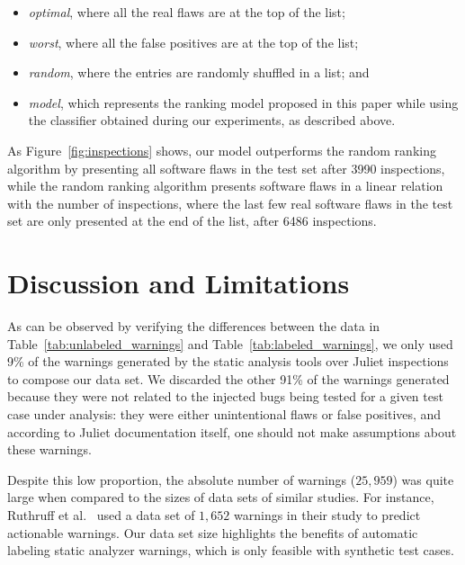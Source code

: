 \begin{itemize}
\item\textit{optimal}, where all the real flaws are at the top of the list;
\item\textit{worst}, where all the false positives are at the top of the list;
\item\textit{random}, where the entries are randomly shuffled in a list; and
\item\textit{model}, which represents the ranking model proposed in this paper while
using the classifier obtained during our experiments, as described above.
\end{itemize}

As Figure~\ref{fig:inspections} shows, our model outperforms the random ranking
algorithm by presenting all software flaws in the test set after 3990
inspections, while the random ranking algorithm presents software flaws in a
linear relation with the number of inspections, where the last few real
software flaws in the test set are only presented at the end of the list, after
6486 inspections.


\section{Discussion and Limitations}
\label{sec:discussion}

As can be observed by verifying the differences between the data in
Table~\ref{tab:unlabeled_warnings} and Table~\ref{tab:labeled_warnings}, we
only used 9\% of the warnings generated by the static analysis tools over
Juliet inspections to compose our data set. We discarded the other 91\% of the
warnings generated because they were not related to the injected bugs being
tested for a given test case under analysis: they were either unintentional
flaws or false positives, and according to Juliet documentation itself, one
should not make assumptions about these warnings.

Despite this low proportion, the absolute number of warnings ($25,959$) was quite large
when compared to the sizes of data sets of similar studies. For instance, Ruthruff et
al.~\cite{ruthruff_predicting_2008} used a data set of $1,652$ warnings in
their study to predict actionable warnings. Our data set size highlights the
benefits of automatic labeling static analyzer warnings, which is only feasible
with synthetic test cases.

